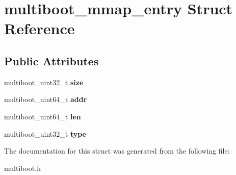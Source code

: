 \hypertarget{structmultiboot__mmap__entry}{}\section{multiboot\+\_\+mmap\+\_\+entry Struct Reference}
\label{structmultiboot__mmap__entry}
\subsection*{Public Attributes}
\begin{DoxyCompactItemize}
\item 
\mbox{\label{structmultiboot__mmap__entry_af10c1835051b4b08bdcdb538c1b4101d}} 
multiboot\+\_\+uint32\+\_\+t {\bfseries size}
\item 
\mbox{\label{structmultiboot__mmap__entry_a3f76a637264b83e30967bcd808ff403c}} 
multiboot\+\_\+uint64\+\_\+t {\bfseries addr}
\item 
\mbox{\label{structmultiboot__mmap__entry_a6bfa44919a328492fa4e3d6239a23352}} 
multiboot\+\_\+uint64\+\_\+t {\bfseries len}
\item 
\mbox{\label{structmultiboot__mmap__entry_aa6fc447c57f074d0babfe3bbb7017de9}} 
multiboot\+\_\+uint32\+\_\+t {\bfseries type}
\end{DoxyCompactItemize}


The documentation for this struct was generated from the following file\+:\begin{DoxyCompactItemize}
\item 
multiboot.\+h\end{DoxyCompactItemize}
